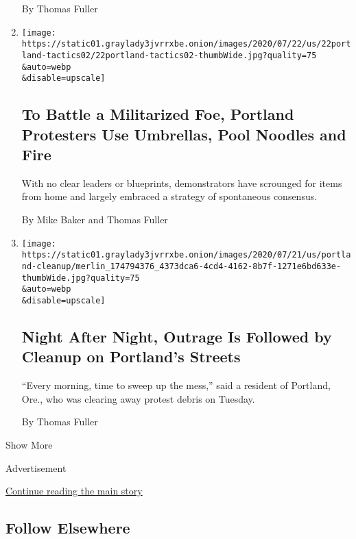 \begin{enumerate}
  By Thomas Fuller
\item
  \href{/2020/07/22/us/portland-protest-tactics.html}{}

  \texttt{[image: https://static01.graylady3jvrrxbe.onion/images/2020/07/22/us/22portland-tactics02/22portland-tactics02-thumbWide.jpg?quality=75\\\&auto=webp\\\&disable=upscale]}

  \hypertarget{to-battle-a-militarized-foe-portland-protesters-use-umbrellas-pool-noodles-and-fire}{%
  \subsection{To Battle a Militarized Foe, Portland Protesters Use
  Umbrellas, Pool Noodles and
  Fire}\label{to-battle-a-militarized-foe-portland-protesters-use-umbrellas-pool-noodles-and-fire}}

  With no clear leaders or blueprints, demonstrators have scrounged for
  items from home and largely embraced a strategy of spontaneous
  consensus.

  By Mike Baker and Thomas Fuller
\item
  \href{/2020/07/21/us/portland-protests-damage-cleanup.html}{}

  \texttt{[image: https://static01.graylady3jvrrxbe.onion/images/2020/07/21/us/portland-cleanup/merlin\_174794376\_4373dca6-4cd4-4162-8b7f-1271e6bd633e-thumbWide.jpg?quality=75\\\&auto=webp\\\&disable=upscale]}

  \hypertarget{night-after-night-outrage-is-followed-by-cleanup-on-portlands-streets}{%
  \subsection{Night After Night, Outrage Is Followed by Cleanup on
  Portland's
  Streets}\label{night-after-night-outrage-is-followed-by-cleanup-on-portlands-streets}}

  ``Every morning, time to sweep up the mess,'' said a resident of
  Portland, Ore., who was clearing away protest debris on Tuesday.

  By Thomas Fuller
\end{enumerate}

Show More

Advertisement

\protect\hyperlink{after-mid2}{Continue reading the main story}

\hypertarget{follow-elsewhere}{%
\subsection{Follow Elsewhere}\label{follow-elsewhere}}

